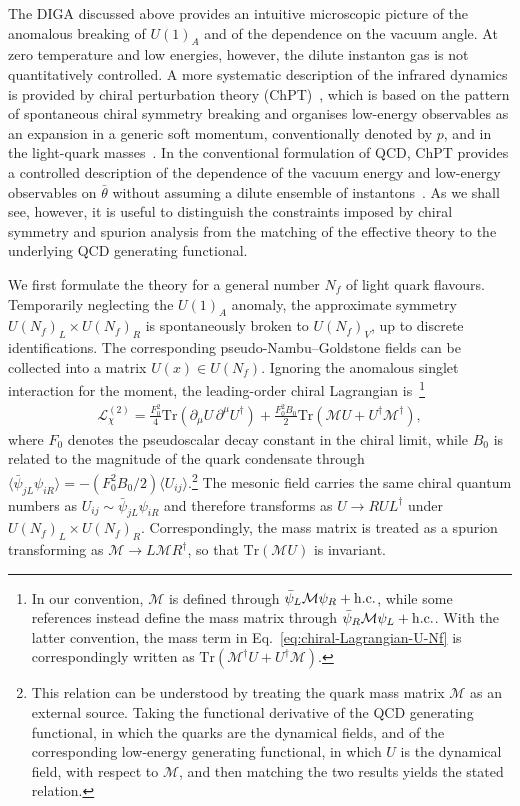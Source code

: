 \documentclass[review]{elsarticle}
\numberwithin{equation}{section}
\numberwithin{table}{section}
\numberwithin{figure}{section}
\def\M{\mathcal{M}}
\def\tr{\mathrm{Tr}}
\def\hc{{\rm h.c.}}
\begin{document}
The DIGA discussed above provides an intuitive microscopic picture of the anomalous breaking of $U(1)_A$ and of the dependence on the vacuum angle. At zero temperature and low energies, however, the dilute instanton gas is not quantitatively controlled. A more systematic description of the infrared dynamics is provided by chiral perturbation theory (ChPT)~\cite{Pich:1995bw,Scherer:2002tk}, which is based on the pattern of spontaneous chiral symmetry breaking and organises low-energy observables as an expansion in a generic soft momentum, conventionally denoted by $p$, and in the light-quark masses~\cite{Gasser:1983yg,Gasser:1984gg}. In the conventional formulation of QCD, ChPT provides a controlled description of the dependence of the vacuum energy and low-energy observables on $\bar\theta$ without assuming a dilute ensemble of instantons~\cite{Crewther:1979pi,Leutwyler:1992yt,GrilliDiCortona:2015jxo,DiLuzio:2020wdo}. As we shall see, however, it is useful to distinguish the constraints imposed by chiral symmetry and spurion analysis from the matching of the effective theory to the underlying QCD generating functional.

We first formulate the theory for a general number $N_f$ of light quark flavours. Temporarily neglecting the $U(1)_A$ anomaly, the approximate symmetry $U(N_f)_L\times U(N_f)_R$ is spontaneously broken to $U(N_f)_V$, up to discrete identifications. The corresponding pseudo-Nambu--Goldstone fields can be collected into a matrix $U(x)\in U(N_f)$. Ignoring the anomalous singlet interaction for the moment, the leading-order chiral Lagrangian is~\cite{Gasser:1983yg,Gasser:1984gg}\footnote{In our convention, $\M$ is defined through $\bar\psi_L\M\psi_R+\hc$, while some references instead define the mass matrix through $\bar\psi_R\M\psi_L+\hc$. With the latter convention, the mass term in Eq.~\eqref{eq:chiral-Lagrangian-U-Nf} is correspondingly written as $\tr(\M^\dagger U+U^\dagger\M)$.}
\begin{align}
    \mathcal{L}^{(2)}_{\chi} = \frac{F_0^2}{4} \tr\left( \partial_\mu U\,\partial^\mu U^\dagger \right) 
    + 
    \frac{F_0^2B_0}{2} \tr\left( \M U+U^\dagger\M^\dagger \right),\label{eq:chiral-Lagrangian-U-Nf}
\end{align}
where $F_0$ denotes the pseudoscalar decay constant in the chiral limit, while $B_0$ is related to the magnitude of the quark condensate through
$\langle \bar\psi_{jL}\psi_{iR}\rangle = -(F_0^2B_0/2)\langle U_{ij}\rangle$.\footnote{This relation can be understood by treating the quark mass matrix $\M$ as an external source. Taking the functional derivative of the QCD generating functional, in which the quarks are the dynamical fields, and of the corresponding low-energy generating functional, in which $U$ is the dynamical field, with respect to $\M$, and then matching the two results yields the stated relation.} The mesonic field carries the same chiral quantum numbers as $U_{ij}\sim\bar\psi_{jL}\psi_{iR}$ and therefore transforms as $U\to RUL^\dagger$ under $U(N_f)_L\times U(N_f)_R$. Correspondingly, the mass matrix is treated as a spurion transforming as $\M\to L\M R^\dagger$, so that $\tr(\M U)$ is invariant.
\end{document}
